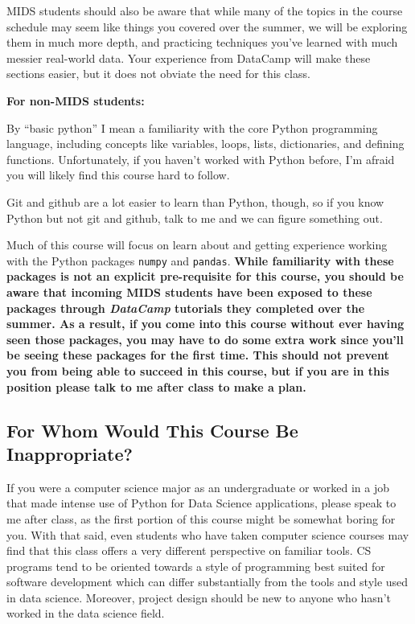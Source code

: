 \documentclass[12pt]{article}
\begin{document}
MIDS students should also be aware that while many of the topics in the course schedule may seem like things you covered over the summer, we will be exploring them in much more depth, and practicing techniques you've learned with much messier real-world data. Your experience from DataCamp will make these sections easier, but it does not obviate the need for this class.

\textbf{For non-MIDS students:}

By ``basic python'' I mean a familiarity with the core Python programming language, including concepts like variables, loops, lists, dictionaries, and defining functions. Unfortunately, if you haven't worked with Python before, I'm afraid you will likely find this course hard to follow.

Git and github are a lot easier to learn than Python, though, so if you know Python but not git and github, talk to me and we can figure something out.

Much of this course will focus on learn about and getting experience working with the Python packages \texttt{numpy} and \texttt{pandas}. \textbf{While familiarity with these packages is not an explicit pre-requisite for this course, you should be aware that incoming MIDS students have been exposed to these packages through \emph{DataCamp} tutorials they completed over the summer. As a result, if you come into this course without ever having seen those packages, you may have to do some extra work since you'll be seeing these packages for the first time. This should not prevent you from being able to succeed in this course, but if you are in this position please talk to me after class to make a plan.}

\subsection{For Whom Would This Course Be Inappropriate?}

If you were a computer science major as an undergraduate or worked in a job that made intense use of Python for Data Science applications, please speak to me after class, as the first portion of this course might be somewhat boring for you. With that said, even students who have taken computer science courses may find that this class offers a very different perspective on familiar tools. CS programs tend to be oriented towards a style of programming best suited for software development which can differ substantially from the tools and style used in data science. Moreover, project design should be new to anyone who hasn't worked in the data science field.
\end{document}

